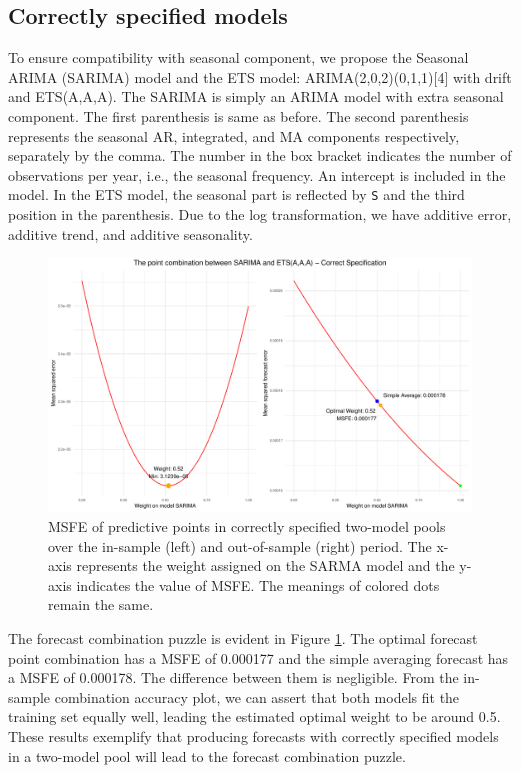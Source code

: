 \documentclass{monashthesis}
\begin{document}
\hypertarget{correctly-specified-models}{%
\subsection{Correctly specified models}\label{correctly-specified-models}}

To ensure compatibility with seasonal component, we propose the Seasonal ARIMA (SARIMA) model and the ETS model: ARIMA(2,0,2)(0,1,1){[}4{]} with drift and ETS(A,A,A). The SARIMA is simply an ARIMA model with extra seasonal component. The first parenthesis is same as before. The second parenthesis represents the seasonal AR, integrated, and MA components respectively, separately by the comma. The number in the box bracket indicates the number of observations per year, i.e., the seasonal frequency. An intercept is included in the model. In the ETS model, the seasonal part is reflected by \texttt{S} and the third position in the parenthesis. Due to the log transformation, we have additive error, additive trend, and additive seasonality.

\begin{figure}[ht]
\centering
\includegraphics[scale=0.6]{figures/EMPL_correct.pdf}
\caption{MSFE of predictive points in correctly specified two-model pools over the in-sample (left) and out-of-sample (right) period. The x-axis represents the weight assigned on the SARMA model and the y-axis indicates the value of MSFE. The meanings of colored dots remain the same.}
\label{fig:sdc}
\end{figure}

The forecast combination puzzle is evident in Figure \ref{fig:sdc}. The optimal forecast point combination has a MSFE of 0.000177 and the simple averaging forecast has a MSFE of 0.000178. The difference between them is negligible. From the in-sample combination accuracy plot, we can assert that both models fit the training set equally well, leading the estimated optimal weight to be around 0.5. These results exemplify that producing forecasts with correctly specified models in a two-model pool will lead to the forecast combination puzzle.
\end{document}

